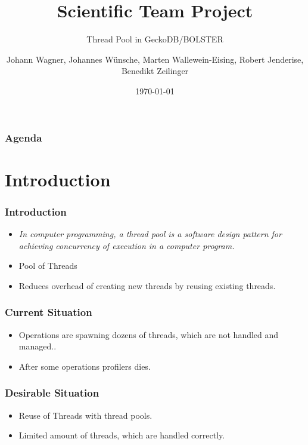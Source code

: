 \documentclass{beamer}
\title{Scientific Team Project}
\subtitle{Thread Pool in GeckoDB/BOLSTER}
\author{Johann Wagner, Johannes Wünsche, Marten Wallewein-Eising, Robert Jenderise, Benedikt Zeilinger}
\date{\today}
\institute{Otto von Guericke University, Magdeburg}
\begin{document}
\begin{frame}[plain]
 \titlepage
\end{frame}



\section[Agenda]{}
	\begin{frame}
	\frametitle{Agenda}
	\tableofcontents
	\end{frame}

\section{Introduction}
	\begin{frame}
		\frametitle{Introduction}
		\begin{itemize}
			\item \emph{In computer programming, a thread pool is a software design pattern for achieving concurrency of execution in a computer program.}
			\item Pool of Threads
			\item Reduces overhead of creating new threads by reusing existing threads.
		\end{itemize}
	\end{frame}
	\begin{frame}
		\frametitle{Current Situation}
		\begin{itemize}
			\item Operations are spawning dozens of threads, which are not handled and managed..
			\item After some operations profilers dies.
		\end{itemize}
	\end{frame}

	\begin{frame}
		\frametitle{Desirable Situation}
		\begin{itemize}
			\item Reuse of Threads with thread pools.
			\item Limited amount of threads, which are handled correctly.
		\end{itemize}
	\end{frame}
\end{document}
